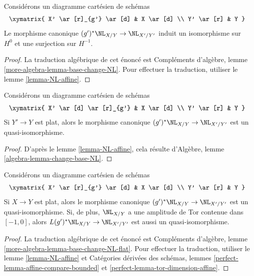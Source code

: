 \begin{lemma}
\label{lemma-base-change-NL}
Considérons un diagramme cartésien de schémas
$$
\xymatrix{
X' \ar[r]_{g'} \ar[d] & X \ar[d] \\
Y' \ar[r] & Y
}
$$
Le morphisme canonique $(g')^*\NL_{X/Y} \to \NL_{X'/Y'}$ induit
un isomorphisme sur $H^0$ et une surjection sur $H^{-1}$.
\end{lemma}

\begin{proof}
La traduction algébrique de cet énoncé est
Compléments d'algèbre, lemme \ref{more-algebra-lemma-base-change-NL}.
Pour effectuer la traduction, utiliser le lemme \ref{lemma-NL-affine}.
\end{proof}

\begin{lemma}
\label{lemma-flat-base-change-NL}
Considérons un diagramme cartésien de schémas
$$
\xymatrix{
X' \ar[d] \ar[r]_{g'} & X \ar[d] \\
Y' \ar[r] & Y
}
$$
Si $Y' \to Y$ est plat, alors le morphisme canonique
$(g')^*\NL_{X/Y} \to \NL_{X'/Y'}$ est un quasi-isomorphisme.
\end{lemma}

\begin{proof}
D'après le lemme \ref{lemma-NL-affine}, cela résulte d'Algèbre,
lemme \ref{algebra-lemma-change-base-NL}.
\end{proof}

\begin{lemma}
\label{lemma-base-change-NL-flat}
Considérons un diagramme cartésien de schémas
$$
\xymatrix{
X' \ar[r]_{g'} \ar[d] & X \ar[d] \\
Y' \ar[r] & Y
}
$$
Si $X \to Y$ est plat, alors le morphisme canonique
$(g')^*\NL_{X/Y} \to \NL_{X'/Y'}$ est un quasi-isomorphisme.
Si, de plus, $\NL_{X/Y}$ a une amplitude de Tor contenue dans $[-1, 0]$,
alors $L(g')^*\NL_{X/Y} \to \NL_{X'/Y'}$ est aussi un quasi-isomorphisme.
\end{lemma}

\begin{proof}
La traduction algébrique de cet énoncé est
Compléments d'algèbre, lemme \ref{more-algebra-lemma-base-change-NL-flat}.
Pour effectuer la traduction, utiliser le lemme \ref{lemma-NL-affine}
et Catégories dérivées des schémas, lemmes
\ref{perfect-lemma-affine-compare-bounded} et
\ref{perfect-lemma-tor-dimension-affine}.
\end{proof}














